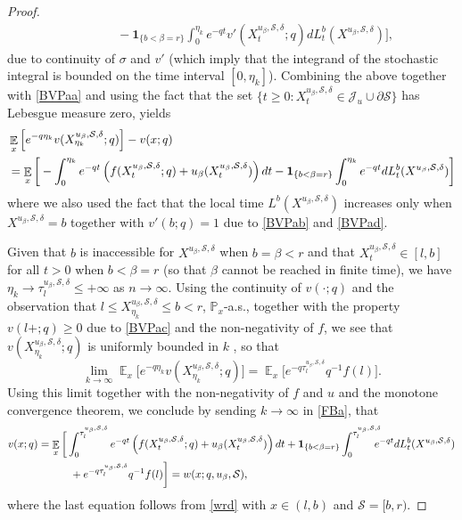 \documentclass[11pt]{article} %
\DeclareMathOperator{\E}{\mathbb E}
\numberwithin{komcounter}{section}
\begin{document}
\begin{proof}
\begin{align*}
&\qquad \quad - \mathbf{1}_{\{b < \beta = r\}}  \int_0^{\eta_k} e^{-qt} v'(X^{u_\beta,\mathcal{S},\delta}_{t};q) dL^{b}_t(X^{u_\beta,\mathcal{S},\delta})  \bigg],
\end{align*}
due to continuity of $\sigma$ and $v'$ (which imply that the integrand of the stochastic integral is bounded on the time interval $[0,\eta_k]$). 
Combining the above together with \eqref{BVPaa} and using the fact that the set $\{t \geq 0 :  X^{u_\beta,\mathcal{S},\delta}_t \in \mathcal{J}_u\cup \partial\mathcal{S}\}$ has Lebesgue measure zero, yields
\begin{align} \label{FBa}
&\E_x\left[e^{- q \eta_k} v(X^{u_\beta,\mathcal{S},\delta}_{\eta_k};q) \right] - v(x;q) \notag\\
&= \E_x\bigg[- \int_0^{\eta_k } e^{-qt}  \left( f(X^{u_\beta,\mathcal{S},\delta}_t;q) + u_\beta(X^{u_\beta,\mathcal{S},\delta}_t) \right) dt - \mathbf{1}_{\{b < \beta = r\}} \int_0^{\eta_k} e^{-qt} dL^{b}_t(X^{u_\beta,\mathcal{S},\delta}) \bigg]
\end{align}
where we also used the fact that the local time $L^{b}(X^{u_\beta,\mathcal{S},\delta})$ increases only when $X^{u_\beta,\mathcal{S},\delta} = b$ together with $v'(b;q) = 1$ due to \eqref{BVPab} and \eqref{BVPad}. 

Given that $b$ is inaccessible for $X^{u_\beta,\mathcal{S},\delta}$ when $b=\beta<r$ and that $X^{u_\beta,\mathcal{S},\delta}_t \in [l,b]$ for all $t>0$ when $b<\beta=r$ (so that $\beta$ cannot be reached in finite time), we have $\eta_k \rightarrow \tau^{u_\beta,\mathcal{S},\delta}_l \leq +\infty$ as $n\rightarrow\infty$. 
Using the continuity of $v(\cdot;q)$ and the observation that $l\leq X^{u_\beta,\mathcal{S},\delta}_{\eta_k}\leq b<r$, $\mathbb{P}_x$-a.s., together with the property $v(l+;q) \geq 0$ due to \eqref{BVPac} and the non-negativity of $f$, we see that $v(X^{u_\beta,\mathcal{S},\delta}_{\eta_k};q)$ is uniformly bounded in $k$ , so that
$$
\lim_{k \to \infty} \E_x\Big[e^{- q \eta_k} v(X^{u_\beta,\mathcal{S},\delta}_{\eta_k};q) \Big] = \E_x\Big[e^{- q \tau^{u_\beta,\mathcal{S},\delta}_l} q^{-1} f(l) \Big].
$$
Using this limit together with the non-negativity of $f$ and $u$ and the monotone convergence theorem, we conclude by sending $k \rightarrow \infty$ in \eqref{FBa}, that
\begin{align} \label{eq:vxq}
\begin{split}
v(x;q) &= \E_x\bigg[\int_0^{\tau^{u_\beta,\mathcal{S},\delta}_l} e^{-qt} \left( f(X^{u_\beta,\mathcal{S},\delta}_t;q) + u_\beta(X^{u_\beta,\mathcal{S},\delta}_t) \right) dt + \mathbf{1}_{\{b < \beta = r\}} \int_0^{\tau^{u_\beta,\mathcal{S},\delta}_l} \hspace{-3mm}e^{-qt} dL^{b}_t(X^{u_\beta,\mathcal{S},\delta}) \\
&\qquad \quad + e^{- q \tau^{u_\beta,\mathcal{S},\delta}_l} q^{-1} f(l) \bigg]
= w(x;q, u_\beta,\mathcal{S}),
\end{split}
\end{align}
where the last equation follows from \eqref{wrd} with $x \in (l,b)$ and $\mathcal{S}=[b,r)$. 


\end{proof}
\end{document}
